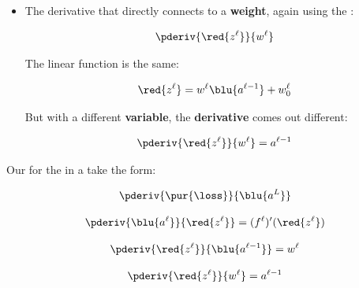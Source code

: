         \begin{itemize}
                
            \item The derivative that directly connects to a \textbf{weight}, again using the :
            
                \begin{equation}
                    \pderiv {\red{z^\ell}}   {w^{\ell}}
                \end{equation}
                
                The linear function is the same:
            
                \begin{equation}
                    \red{z^\ell} = w^\ell \blu{ a^{\ell-1} } + w_0^\ell
                \end{equation}
                
                But with a different \textbf{variable}, the \textbf{derivative} comes out different:
                
                \begin{equation}
                    \pderiv {\red{z^\ell}}   {w^{\ell}}
                    =
                    a^{\ell-1} 
                \end{equation}
                
        \end{itemize}
        
    \begin{notation}
        Our  for the  in a  take the form:
        
        \begin{equation*}
            \pderiv {\pur{\loss}} {\blu{a^L}}
        \end{equation*}
        
        \begin{equation*}
            \pderiv {\blu{a^\ell}}   {\red{z^\ell}} = (f^\ell)'(\red{z^\ell})
        \end{equation*}
        
        \begin{equation*}
            \pderiv {\red{z^\ell}}   {\blu{a^{\ell-1}}}
            =
            w^{\ell}
        \end{equation*}
        
        \begin{equation*}
            \pderiv {\red{z^\ell}}   {w^{\ell}}
            =
            a^{\ell-1} 
        \end{equation*}
    \end{notation}

